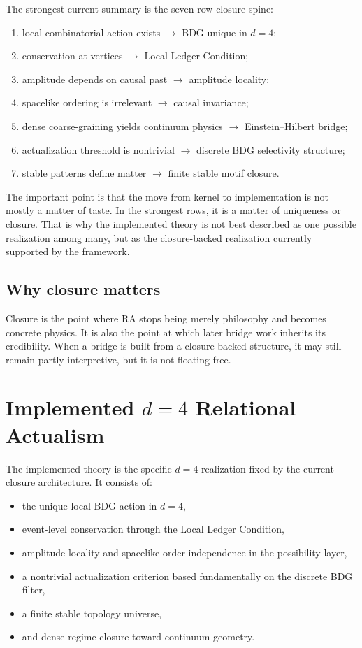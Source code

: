 \documentclass[11pt]{article}
\begin{document}
The strongest current summary is the seven-row closure spine:
\begin{enumerate}[label=\arabic*.]
    \item local combinatorial action exists $\rightarrow$ BDG unique in $d=4$;
    \item conservation at vertices $\rightarrow$ Local Ledger Condition;
    \item amplitude depends on causal past $\rightarrow$ amplitude locality;
    \item spacelike ordering is irrelevant $\rightarrow$ causal invariance;
    \item dense coarse-graining yields continuum physics $\rightarrow$ Einstein--Hilbert bridge;
    \item actualization threshold is nontrivial $\rightarrow$ discrete BDG selectivity structure;
    \item stable patterns define matter $\rightarrow$ finite stable motif closure.
\end{enumerate}

The important point is that the move from kernel to implementation is not mostly a matter of taste. In the strongest rows, it is a matter of uniqueness or closure. That is why the implemented theory is not best described as one possible realization among many, but as the closure-backed realization currently supported by the framework.

\subsection{Why closure matters}
Closure is the point where RA stops being merely philosophy and becomes concrete physics. It is also the point at which later bridge work inherits its credibility. When a bridge is built from a closure-backed structure, it may still remain partly interpretive, but it is not floating free.

\section{Implemented \texorpdfstring{$d=4$}{d=4} Relational Actualism}\label{sec:implemented}
The implemented theory is the specific $d=4$ realization fixed by the current closure architecture. It consists of:
\begin{itemize}
    \item the unique local BDG action in $d=4$,
    \item event-level conservation through the Local Ledger Condition,
    \item amplitude locality and spacelike order independence in the possibility layer,
    \item a nontrivial actualization criterion based fundamentally on the discrete BDG filter,
    \item a finite stable topology universe,
    \item and dense-regime closure toward continuum geometry.
\end{itemize}
\end{document}
